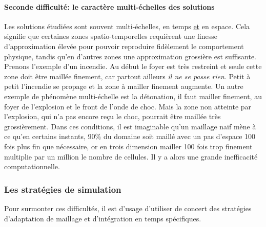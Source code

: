     \paragraph{Seconde difficulté: le caractère multi-échelles des solutions}
        Les solutions étudiées sont souvent multi-échelles, en temps \underline{et} en espace. Cela signifie que certaines zones spatio-temporelles requièrent
        une finesse d'approximation élevée pour pouvoir reproduire fidèlement le comportement physique, tandis qu'en d'autres zones une approximation
        grossière est suffisante. Prenons l'exemple d'un incendie. Au début le foyer est très restreint et seule cette zone doit être maillée finement, 
        car partout ailleurs \textit{il ne se passe rien}. Petit à petit l'incendie se propage et la zone à mailler finement augmente. Un autre exemple de phénomène 
        multi-échelle est la détonation, il faut mailler finement, au foyer de l'explosion et le front de l'onde de choc. Mais la zone non atteinte par l'explosion, 
        qui n'a pas encore reçu le choc, pourrait être maillée très grossièrement. 
        Dans ces conditions, il est imaginable qu'un maillage naïf mène à ce qu'en certains instants, 90\% du domaine soit maillé avec un pas d'espace 100 fois plus fin que nécessaire,
        or en trois dimension mailler 100 fois trop finement multiplie par un million le nombre de cellules.
        Il y a alors une grande inefficacité computationnelle.


\subsubsection{Les stratégies de simulation}
    Pour surmonter ces difficultés, il est d'usage d'utiliser de concert des stratégies d'adaptation de maillage et d'intégration en temps spécifiques. 
